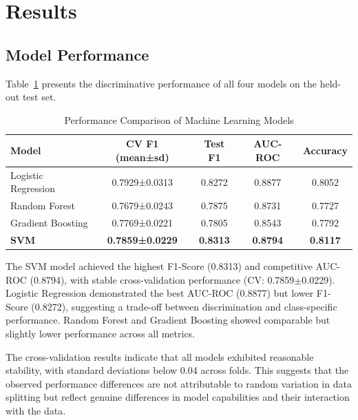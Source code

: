 
\section{Results}

\subsection{Model Performance}

Table~\ref{tab:performance} presents the discriminative performance of 
all four models on the held-out test set.

\begin{table}[H]
\centering
\caption{Performance Comparison of Machine Learning Models}
\begin{tabular}{lcccc}
\toprule
\textbf{Model} & \textbf{CV F1 (mean±sd)} & \textbf{Test F1} & 
\textbf{AUC-ROC} & \textbf{Accuracy} \\
\midrule
Logistic Regression & 0.7929±0.0313 & 0.8272 & 0.8877 & 0.8052 \\
Random Forest & 0.7679±0.0243 & 0.7875 & 0.8731 & 0.7727 \\
Gradient Boosting & 0.7769±0.0221 & 0.7805 & 0.8543 & 0.7792 \\
\textbf{SVM} & \textbf{0.7859±0.0229} & \textbf{0.8313} & \textbf{0.8794} & \textbf{0.8117} \\
\bottomrule
\end{tabular}
\label{tab:performance}
\end{table}

The SVM model achieved the highest F1-Score (0.8313) and competitive 
AUC-ROC (0.8794), with stable cross-validation performance (CV: 
0.7859$\pm$0.0229). Logistic Regression demonstrated the best AUC-ROC 
(0.8877) but lower F1-Score (0.8272), suggesting a trade-off between 
discrimination and class-specific performance. Random Forest and Gradient 
Boosting showed comparable but slightly lower performance across all metrics.

The cross-validation results indicate that all models exhibited reasonable 
stability, with standard deviations below 0.04 across folds. This suggests 
that the observed performance differences are not attributable to random 
variation in data splitting but reflect genuine differences in model 
capabilities and their interaction with the data.

